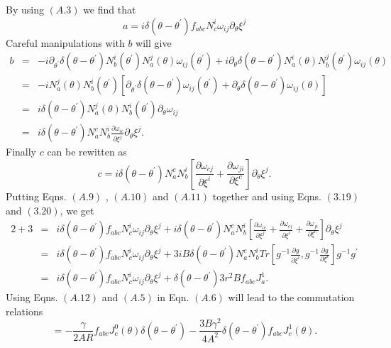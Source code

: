 \documentclass[a4paper,12pt]{article}
\begin{document}
By using $(A.3)$ we find that 
\begin{equation}
a=i{\delta}(\theta -
{\theta}^{'})f_{abc}N_c^i{\omega}_{ij}{\partial}_{\theta}{\xi}^j
\end{equation}
Careful manipulations with $b$ will give 
\begin{eqnarray}
b&=&-i{\partial}_{{\theta}^{'}}{\delta}
(\theta -{\theta}^{'})N_{b}^{i}({\theta}^{'}) 
N_a^j(\theta) {\omega}_{ij}({\theta}^{'})+
i{\partial}_{{\theta}}{\delta}(\theta -
{\theta}^{'})N_{a}^{i}({\theta}) N_b^j({\theta}^{'}) 
{\omega}_{ij}({\theta})\nonumber\\
&=&-iN_a^j(\theta)N_b^i({\theta}^{'})[{\partial}_{{\theta}^{'}}{\delta}
(\theta -{\theta}^{'}){\omega}_{ij}({\theta}^{'}) +
{\partial}_{{\theta}}{\delta}(\theta -
{\theta}^{'}){\omega}_{ij}({\theta})]\nonumber\\
&=&i{\delta}(\theta -
{\theta}^{'})N_a^j(\theta)N_b^i({\theta}^{'}){\partial}_{\theta}
{\omega}_{ij}\nonumber\\
&=&i{\delta}(\theta -
{\theta}^{'})N_a^cN_b^i 
\frac{{\partial}{\omega}_{ic}}{{\partial{\xi}^j}}\partial_{\theta}{\xi}^j.
\end{eqnarray}
Finally $c$ can be rewitten as
\begin{equation}
c=i{\delta}(\theta -
{\theta}^{'})N_a^c N_b^i
[\frac{{\partial}{\omega}_{cj}}{{\partial{\xi}^i}} + 
\frac{{\partial}{\omega}_{ji}}{{\partial{\xi}^c}}]\partial_{\theta}{\xi}^j.
\end{equation} 
Putting Eqns. $(A.9)$ , $(A.10)$ and $(A.11)$ together
 and using Eqns. $(3.19)$ and $(3.20)$, we get
\begin{eqnarray}
2+3&=&i{\delta}(\theta -
{\theta}^{'})f_{abc}N_c^i{\omega}_{ij}{\partial}_{\theta}{\xi}^j +
 i{\delta}(\theta -
{\theta}^{'})N_a^c N_b^i
[\frac{{\partial}{\omega}_{ic}}{{\partial{\xi}^j}} +
 \frac{{\partial}{\omega}_{cj}}{{\partial{\xi}^i}} + 
\frac{{\partial}{\omega}_{ji}}{{\partial{\xi}^c}}]
\partial_{\theta}{\xi}^j\nonumber\\
&=&i{\delta}(\theta -{\theta}^{'})
f_{abc}N_c^i{\omega}_{ij}{\partial}_{\theta}{\xi}^j + 
3iB {\delta}(\theta -{\theta}^{'})
N_a^cN_b^iTr[g^{-1}\frac{{\partial}{g}}
{\partial{\xi}^i},g^{-1}\frac{{\partial}{g}}
{\partial{\xi}^c}]g^{-1}g^{'}\nonumber\\
&=&i{\delta}(\theta -{\theta}^{'})
f_{abc}N_c^i{\omega}_{ij}{\partial}_{\theta}{\xi}^j + 
{\delta}(\theta -{\theta}^{'})3r^2Bf_{abc}J_a^{1}.
\end{eqnarray}
Using Eqns. $(A.12)$ 
and $(A.5)$ in Eqn. $(A.6)$ will lead to the commutation relations
\begin{equation}
[J^{0}_a({\theta}),J^{0}_b({\theta}^{'})]=-\frac{\gamma}{2AR} f_{abc} 
J^{0}_{c}(\theta) {\delta}(\theta - {\theta}^{'}) 
- \frac{3B{\gamma}^2}{4A^2} {\delta}({\theta} 
-{\theta}^{'}) f_{abc}J^{1}_{c}(\theta).
\end{equation}
\end{document}
